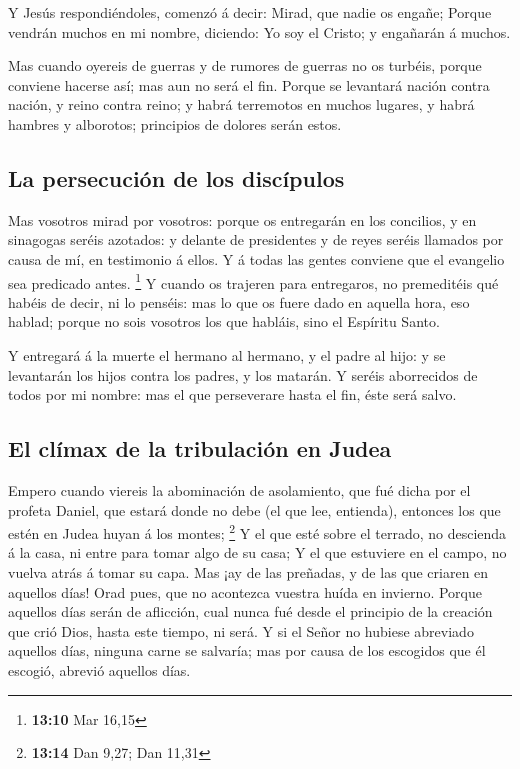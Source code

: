  Y Jesús respondiéndoles, comenzó á decir: Mirad, que
nadie os engañe;  Porque vendrán muchos en mi nombre,
diciendo: Yo soy el Cristo; y engañarán á muchos.

 Mas cuando oyereis de guerras y de rumores de guerras no
os turbéis, porque conviene hacerse así; mas aun no será el fin.
 Porque se levantará nación contra nación, y reino contra
reino; y habrá terremotos en muchos lugares, y habrá hambres y
alborotos; principios de dolores serán estos.

\hypertarget{la-persecuciuxf3n-de-los-discuxedpulos}{%
\subsection{La persecución de los
discípulos}\label{la-persecuciuxf3n-de-los-discuxedpulos}}

 Mas vosotros mirad por vosotros: porque os entregarán en
los concilios, y en sinagogas seréis azotados: y delante de presidentes
y de reyes seréis llamados por causa de mí, en testimonio á ellos.
 Y á todas las gentes conviene que el evangelio sea
predicado antes. \footnote{\textbf{13:10} Mar 16,15}  Y
cuando os trajeren para entregaros, no premeditéis qué habéis de decir,
ni lo penséis: mas lo que os fuere dado en aquella hora, eso hablad;
porque no sois vosotros los que habláis, sino el Espíritu Santo.

 Y entregará á la muerte el hermano al hermano, y el
padre al hijo: y se levantarán los hijos contra los padres, y los
matarán.  Y seréis aborrecidos de todos por mi nombre:
mas el que perseverare hasta el fin, éste será salvo.

\hypertarget{el-cluxedmax-de-la-tribulaciuxf3n-en-judea}{%
\subsection{El clímax de la tribulación en
Judea}\label{el-cluxedmax-de-la-tribulaciuxf3n-en-judea}}

 Empero cuando viereis la abominación de asolamiento, que
fué dicha por el profeta Daniel, que estará donde no debe (el que lee,
entienda), entonces los que estén en Judea huyan á los montes;
\footnote{\textbf{13:14} Dan 9,27; Dan 11,31}  Y el que
esté sobre el terrado, no descienda á la casa, ni entre para tomar algo
de su casa;  Y el que estuviere en el campo, no vuelva
atrás á tomar su capa.  Mas ¡ay de las preñadas, y de las
que criaren en aquellos días!  Orad pues, que no
acontezca vuestra huída en invierno.  Porque aquellos
días serán de aflicción, cual nunca fué desde el principio de la
creación que crió Dios, hasta este tiempo, ni será.  Y si
el Señor no hubiese abreviado aquellos días, ninguna carne se salvaría;
mas por causa de los escogidos que él escogió, abrevió aquellos días.

